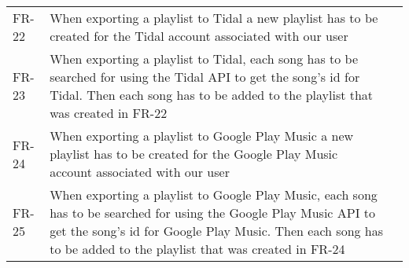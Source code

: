\begin{longtable}{lXl}
			FR-22 & When exporting a playlist to Tidal a new playlist has to be created for the Tidal account associated with our user & \\
			FR-23 & When exporting a playlist to Tidal, each song has to be searched for using the Tidal API to get the song's id for Tidal. Then each song has to be added to the playlist that was created in FR-22 & \\
			FR-24 & When exporting a playlist to Google Play Music a new playlist has to be created for the Google Play Music account associated with our user & \\
			FR-25 & When exporting a playlist to Google Play Music, each song has to be searched for using the Google Play Music API to get the song's id for Google Play Music. Then each song has to be added to the playlist that was created in FR-24 & \\
\end{longtable}